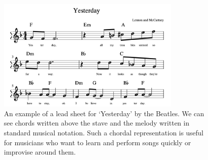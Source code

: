 \begin{figure}[H]
    \centering
    \includegraphics[width=0.8\textwidth]{figures/lead_sheet_example.png}
    \caption{An example of a lead sheet for `Yesterday' by the Beatles. We can see chords written above the stave and the melody written in standard musical notation. Such a chordal representation is useful for musicians who want to learn and perform songs quickly or improvise around them.}\label{fig:lead_sheet_example}
\end{figure}




